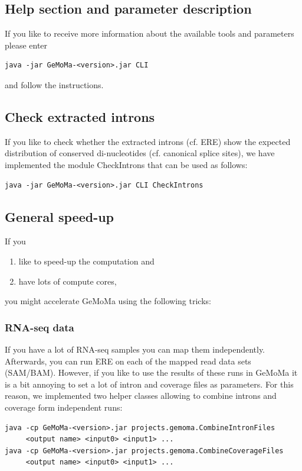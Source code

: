 \documentclass{article}
\begin{document}
\subsection{Help section and parameter description}
If you like to receive more information about the available tools and parameters please enter
\begin{verbatim}
java -jar GeMoMa-<version>.jar CLI
\end{verbatim}
and follow the instructions.

\subsection{Check extracted introns}
If you like to check whether the extracted introns (cf. ERE) show the expected distribution of conserved di-nucleotides (cf. canonical splice sites), we have implemented the module CheckIntrons that can be used as follows:
\begin{verbatim}
java -jar GeMoMa-<version>.jar CLI CheckIntrons
\end{verbatim}

\subsection{General speed-up}
If you
\begin{enumerate}
\item like to speed-up the computation and
\item have lots of compute cores,
\end{enumerate}
you might accelerate GeMoMa using the following tricks:

\subsubsection{RNA-seq data}
If you have a lot of RNA-seq samples you can map them independently. Afterwards, you can run ERE on each of the mapped read data sets (SAM/BAM). However, if you like to use the results of these runs in GeMoMa it is a bit annoying to set a lot of intron and coverage files as parameters. For this reason, we implemented two helper classes allowing to combine introns and coverage form independent runs:

\begin{verbatim}
java -cp GeMoMa-<version>.jar projects.gemoma.CombineIntronFiles
     <output name> <input0> <input1> ...
java -cp GeMoMa-<version>.jar projects.gemoma.CombineCoverageFiles
     <output name> <input0> <input1> ...
\end{verbatim}
\end{document}
